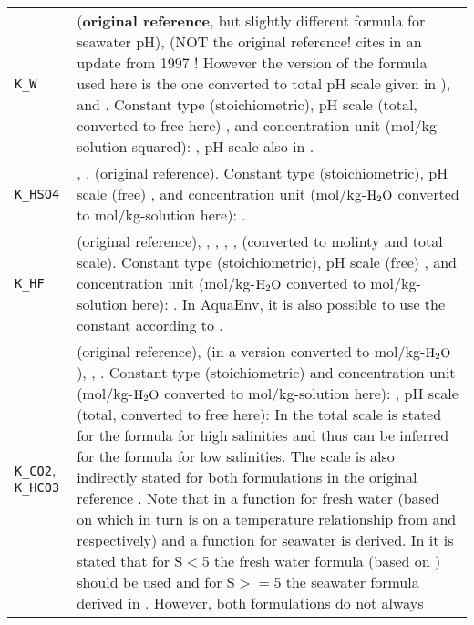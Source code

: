 \documentclass[article,nojss]{jss}
\begin{document}
\begin{footnotesize}
\begin{longtable}{p{}|p{}}
\texttt{K\_W}       & \citet[p.670]{Millero1995} (\textbf{original reference}, but slightly different formula for seawater pH), \citet[chapter 5, p. 18]{DOE1994} (NOT the original reference! \citet{DOE1994} cites in an update from 1997 \citet{Millero1995}! 
However the version of the formula used here is the one converted to total pH scale given in \citet{DOE1994}), and \citet[p. 258]{Zeebe2001}. Constant type (stoichiometric), 
pH scale (total, converted to free here) , and 
concentration unit (mol/kg-solution squared): \citet[chapter 5, p. 12,18]{DOE1994}, pH scale also in \citet[p. 258]{Zeebe2001}.\\
\texttt{K\_HSO4}     & \citet[chapter 5 page 13]{DOE1994}, \citet[p. 260]{Zeebe2001}, \citet{Dickson1990a} (original reference). Constant type (stoichiometric), pH scale (free) , and 
concentration unit (mol/kg-$\rm H_2O$ converted to mol/kg-solution here): \citet[chapter 5, p. 13]{DOE1994}.\\
\texttt{K\_HF}       & \citet[p. 91]{Dickson1979} (original reference), \citet[c. 5, p. 15]{DOE1994}, \citet[p. 257]{Roy1993b}, \citet[p. 1783]{Dickson1987}, \citet[p. 664]{Millero1995}, \citet[p. 260]{Zeebe2001} 
(converted to molinty and total scale).  Constant type (stoichiometric), pH scale (free) , and 
concentration unit (mol/kg-$\rm H_2O$ converted to mol/kg-solution here): \citet[chapter 5, p. 15, 16]{DOE1994}. In \textsf{AquaEnv}, it is also possible to use the constant according to \cite{Perez1987a}. \\
\texttt{K\_CO2}, \texttt{K\_HCO3}  & \citet[p. 254]{Roy1993b} (original reference), \citet[chapter 5, p.14]{DOE1994} (in a version converted to mol/kg-$\rm H_2O$), \citet[p. 664]{Millero1995}, \citet[p. 255]{Zeebe2001}.
Constant type (stoichiometric) and  concentration unit (mol/kg-$\rm H_2O$ converted to mol/kg-solution here): \citet[chapter 5, p. 14, 15]{DOE1994}, pH scale (total, converted to free here): 
In \citet[chapter 5, p. 12]{DOE1994} the total scale is stated for the formula for high salinities and thus can be inferred for the formula for low salinities. 
The scale is also indirectly stated for both formulations in the original reference \citet{Roy1993b}. Note that in \citet{Roy1993b} a function for fresh water (based on \cite{Millero1979} which in turn is on a temperature relationship from \cite{Harned1943} and \cite{Harned1941} respectively) and a function for seawater is derived. In \citet{Millero1995} it is stated that for S$<$5 the fresh water formula (based on \cite{Millero1979}) should be used and for S$>=$5 the seawater formula derived in \citet{Roy1993b}. However, both formulations do not always 

\end{longtable}
\end{footnotesize}
\end{document}
